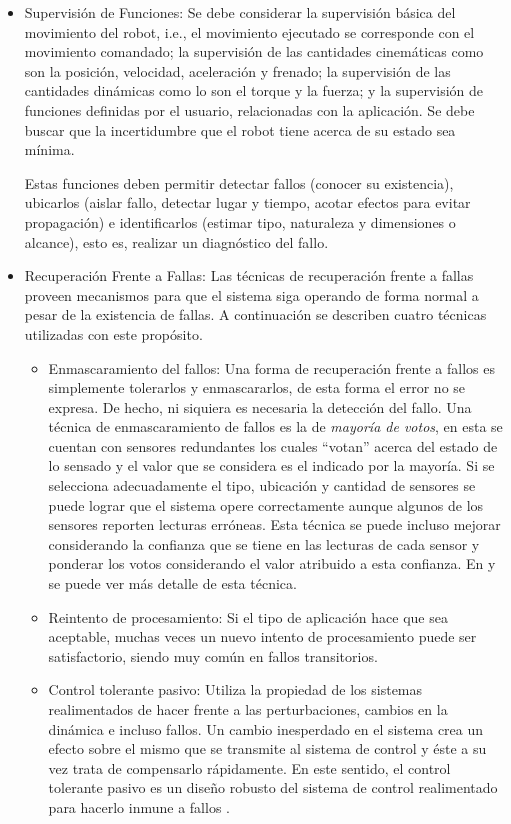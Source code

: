 \documentclass[withindex,glossary]{cam-thesis}
\begin{document}
\begin{itemize}
\item Supervisión de Funciones: 
Se debe considerar la supervisión básica del movimiento del robot, i.e., el movimiento ejecutado se corresponde con el movimiento comandado; la supervisión de las cantidades cinemáticas como son la posición, velocidad, aceleración y frenado; la supervisión de las cantidades dinámicas como lo son el torque y la fuerza; y la supervisión de funciones definidas por el usuario, relacionadas con la aplicación. Se debe buscar que la incertidumbre que el robot tiene acerca de su estado sea mínima.

Estas funciones deben permitir detectar fallos (conocer su existencia), ubicarlos (aislar fallo, detectar lugar y tiempo, acotar efectos para evitar propagación) e identificarlos (estimar tipo, naturaleza y dimensiones o alcance), esto es, realizar un diagnóstico del fallo.
\item Recuperación Frente a Fallas: 
Las técnicas de recuperación frente a fallas proveen mecanismos para que el sistema siga operando de forma normal a pesar de la existencia de fallas. A continuación se describen cuatro técnicas utilizadas con este propósito.
	\begin{itemize}
		\item Enmascaramiento del fallos: Una forma de recuperación frente a fallos es simplemente tolerarlos y enmascararlos, de esta forma el error no se expresa. De hecho, ni siquiera es necesaria la detección del fallo. Una técnica de enmascaramiento de fallos es la de \textit{mayoría de votos}, en esta se cuentan con sensores redundantes los cuales ``votan'' acerca del estado de lo sensado y el valor que se considera es el indicado por la mayoría. Si se selecciona adecuadamente el tipo, ubicación y cantidad de sensores se puede lograr que el sistema opere correctamente aunque algunos de los sensores reporten lecturas erróneas. Esta técnica se puede incluso mejorar considerando la confianza que se tiene en las lecturas de cada sensor y ponderar los votos considerando el valor atribuido a esta confianza. En \cite{GARCIA200711} y \cite{ROGINA1999} se puede ver más detalle de esta técnica.
		\item Reintento de procesamiento: Si el tipo de aplicación hace que sea aceptable, muchas veces un nuevo intento de procesamiento puede ser satisfactorio, siendo muy común en fallos transitorios.
		\item Control tolerante pasivo: Utiliza la propiedad de los sistemas realimentados de hacer frente a las perturbaciones, cambios en la dinámica e incluso fallos. Un cambio inesperdado en el sistema crea un efecto sobre el mismo que se transmite al sistema de control y éste a su vez trata de compensarlo rápidamente. En este sentido, el control tolerante pasivo es un diseño robusto del sistema de control realimentado para hacerlo inmune a fallos \cite{PATTON19971029}.

\end{itemize}
\end{itemize}
\end{document}
